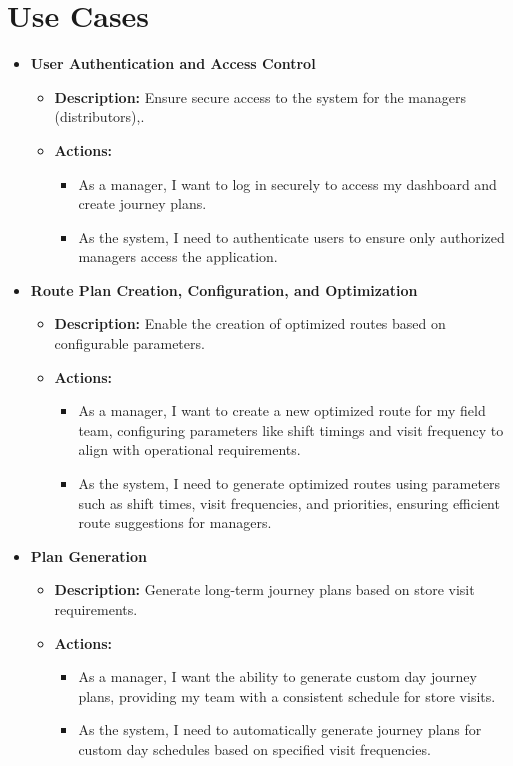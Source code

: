 \section{Use Cases}
\begin{itemize}
    \item \textbf{User Authentication and Access Control}
    \begin{itemize}
        \item \textbf{Description:} Ensure secure access to the system for the managers (distributors),.
        \item \textbf{Actions:}
        \begin{itemize}
            \item As a manager, I want to log in securely to access my dashboard and create journey plans.
            \item As the system, I need to authenticate users to ensure only authorized managers access the application.
        \end{itemize}
    \end{itemize}
    
    \item \textbf{Route Plan Creation, Configuration, and Optimization}
    \begin{itemize}
        \item \textbf{Description:} Enable the creation of optimized routes based on configurable parameters.
        \item \textbf{Actions:}
        \begin{itemize}
            \item As a manager, I want to create a new optimized route for my field team, configuring parameters like shift timings and visit frequency to align with operational requirements.
            \item As the system, I need to generate optimized routes using parameters such as shift times, visit frequencies, and priorities, ensuring efficient route suggestions for managers.
        \end{itemize}
    \end{itemize}

    \item \textbf{Plan Generation}
    \begin{itemize}
        \item \textbf{Description:} Generate long-term journey plans based on store visit requirements.
        \item \textbf{Actions:}
        \begin{itemize}
            \item As a manager, I want the ability to generate custom day journey plans, providing my team with a consistent schedule for store visits.
            \item As the system, I need to automatically generate journey plans for custom day schedules based on specified visit frequencies.
        \end{itemize}
    \end{itemize}
    

\end{itemize}
